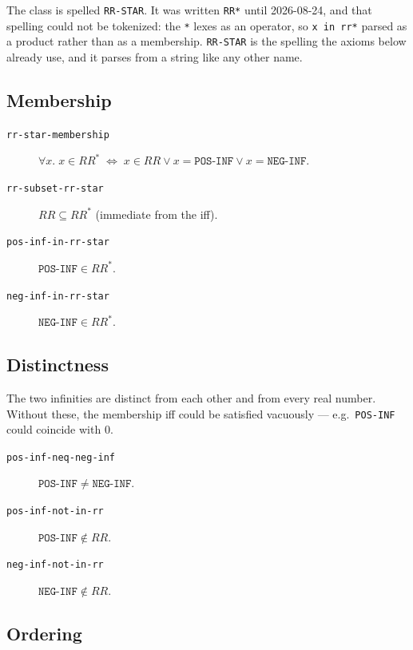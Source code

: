 \begin{remark}
The class is spelled \texttt{RR-STAR}.  It was written \texttt{RR*}
until 2026-08-24, and that spelling could not be tokenized: the
\texttt{*} lexes as an operator, so \texttt{x in rr*} parsed as a
product rather than as a membership.  \texttt{RR-STAR} is the spelling
the axioms below already use, and it parses from a string like any
other name.
\end{remark}

\subsection{Membership}

\begin{description}
\item[\texttt{rr-star-membership}]
  $\forall x.\; x \in \mathit{RR}^{*} \;\Leftrightarrow\;
   x \in \mathit{RR} \lor x = \mathtt{POS\text{-}INF}
                     \lor x = \mathtt{NEG\text{-}INF}.$
\item[\texttt{rr-subset-rr-star}]
  $\mathit{RR} \subseteq \mathit{RR}^{*}$ (immediate from the iff).
\item[\texttt{pos-inf-in-rr-star}]
  $\mathtt{POS\text{-}INF} \in \mathit{RR}^{*}$.
\item[\texttt{neg-inf-in-rr-star}]
  $\mathtt{NEG\text{-}INF} \in \mathit{RR}^{*}$.
\end{description}

\subsection{Distinctness}

The two infinities are distinct from each other and from every real
number.  Without these, the membership iff could be satisfied
vacuously --- e.g.\ \texttt{POS-INF} could coincide with $0$.
\begin{description}
\item[\texttt{pos-inf-neq-neg-inf}]
  $\mathtt{POS\text{-}INF} \neq \mathtt{NEG\text{-}INF}$.
\item[\texttt{pos-inf-not-in-rr}]
  $\mathtt{POS\text{-}INF} \notin \mathit{RR}$.
\item[\texttt{neg-inf-not-in-rr}]
  $\mathtt{NEG\text{-}INF} \notin \mathit{RR}$.
\end{description}

\subsection{Ordering}

